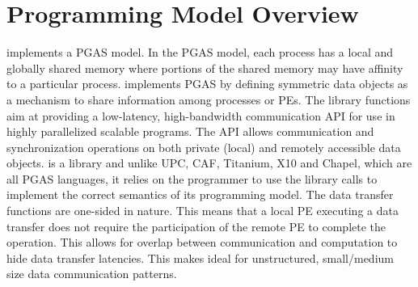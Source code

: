 \section{Programming Model Overview}
\openshmem implements a \ac{PGAS} model. In the \ac{PGAS} model, each process has a local and 
globally shared memory where portions of the shared memory may have affinity to a particular process. 
\openshmem implements \ac{PGAS} by defining symmetric data objects as a mechanism to share information among \openshmem processes or \acp{PE}. 
The \openshmem library functions aim at providing a low-latency, high-bandwidth communication \ac{API} for use in highly parallelized 
scalable programs. The \ac{API} allows communication and synchronization operations on both private (local) and remotely accessible data objects. 
\openshmem is a library and unlike UPC, CAF, Titanium, X10 and Chapel, which are all
PGAS languages, it relies on the programmer to use the library calls  to implement the correct semantics of its programming model.
The \openshmem data transfer functions are one-sided in nature. This means that a local \ac{PE} executing a data transfer does not require the participation of the remote \ac{PE} to complete the operation. This allows for overlap between communication and computation to hide data transfer latencies. This makes  \openshmem ideal for unstructured, small/medium size data communication patterns.



